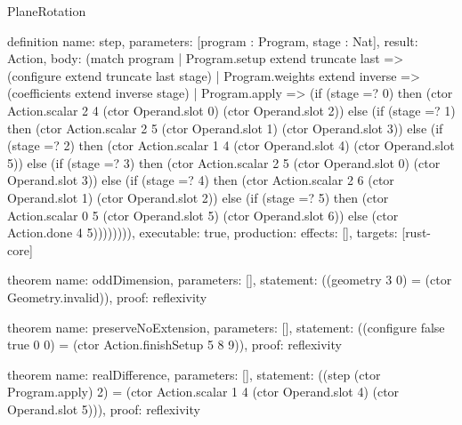 \begin{lexlean}{PlaneRotation}
\begin{semanticmodule}
definition{
  name: step,
  parameters: [program : Program, stage : Nat],
  result: Action,
  body: (match program
    | Program.setup extend truncate last => (configure extend truncate last stage)
    | Program.weights extend inverse => (coefficients extend inverse stage)
    | Program.apply => (if (stage =? 0) then (ctor Action.scalar 2 4 (ctor Operand.slot 0) (ctor Operand.slot 2)) else (if (stage =? 1) then (ctor Action.scalar 2 5 (ctor Operand.slot 1) (ctor Operand.slot 3)) else (if (stage =? 2) then (ctor Action.scalar 1 4 (ctor Operand.slot 4) (ctor Operand.slot 5)) else (if (stage =? 3) then (ctor Action.scalar 2 5 (ctor Operand.slot 0) (ctor Operand.slot 3)) else (if (stage =? 4) then (ctor Action.scalar 2 6 (ctor Operand.slot 1) (ctor Operand.slot 2)) else (if (stage =? 5) then (ctor Action.scalar 0 5 (ctor Operand.slot 5) (ctor Operand.slot 6)) else (ctor Action.done 4 5)))))))),
  executable: true,
  production: {effects: [], targets: [rust-core]}
}

theorem{
  name: oddDimension,
  parameters: [],
  statement: ((geometry 3 0) = (ctor Geometry.invalid)),
  proof: reflexivity{}
}

theorem{
  name: preserveNoExtension,
  parameters: [],
  statement: ((configure false true 0 0) = (ctor Action.finishSetup 5 8 9)),
  proof: reflexivity{}
}

theorem{
  name: realDifference,
  parameters: [],
  statement: ((step (ctor Program.apply) 2) = (ctor Action.scalar 1 4 (ctor Operand.slot 4) (ctor Operand.slot 5))),
  proof: reflexivity{}
}
\end{semanticmodule}
\end{lexlean}
